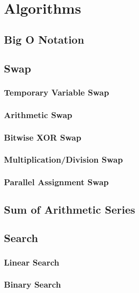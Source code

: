 \chapter{Algorithms}%
\section{Big O Notation}

\section{Swap}
\subsection{Temporary Variable Swap}

\subsection{Arithmetic Swap}

\subsection{Bitwise XOR Swap}

\subsection{Multiplication/Division Swap}

\subsection{Parallel Assignment Swap}

\section{Sum of Arithmetic Series}\label{lbl-sumathsrs}

\section{Search}

\subsection{Linear Search}\label{lbl-linearsch}

\subsection{Binary Search}\label{lbl-binarysch}


